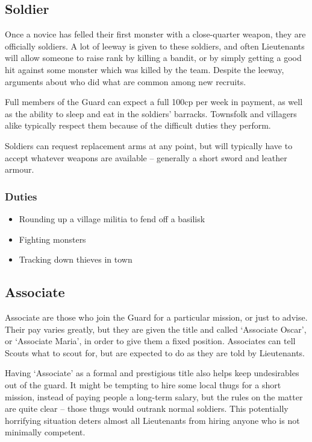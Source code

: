 \begin{multicols}{2}
\subsection{Soldier}

Once a novice has felled their first monster with a close-quarter weapon, they are officially soldiers.
A lot of leeway is given to these soldiers, and often Lieutenants will allow someone to raise rank by killing a bandit, or by simply getting a good hit against some monster which was killed by the team.
Despite the leeway, arguments about who did what are common among new recruits.

Full members of the Guard can expect a full 100cp per week in payment, as well as the ability to sleep and eat in the soldiers' barracks.
Townsfolk and villagers alike typically respect them because of the difficult duties they perform.

Soldiers can request replacement arms at any point, but will typically have to accept whatever weapons are available -- generally a short sword and leather armour.

\subsubsection{Duties}

\begin{itemize}

  \item{Rounding up a village militia to fend off a basilisk}
  \item{Fighting monsters}
  \item{Tracking down thieves in town}
\end{itemize}

\subsection{Associate}

Associate are those who join the Guard for a particular mission, or just to advise.
Their pay varies greatly, but they are given the title and called `Associate Oscar', or `Associate Maria', in order to give them a fixed position.
Associates can tell Scouts what to scout for, but are expected to do as they are told by Lieutenants.

Having `Associate' as a formal and prestigious title also helps keep undesirables out of the \gls{guard}.
It might be tempting to hire some local thugs for a short mission, instead of paying people a long-term salary, but the rules on the matter are quite clear -- those thugs would outrank normal soldiers.
This potentially horrifying situation deters almost all Lieutenants from hiring anyone who is not minimally competent.


\end{multicols}

